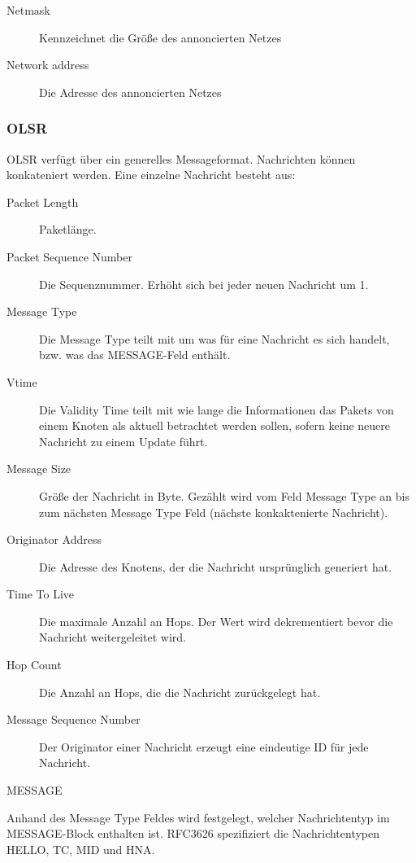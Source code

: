 \documentclass[a4paper,10pt]{article}
\begin{document}
\begin{description}
  \item[Netmask] Kennzeichnet die Größe des annoncierten Netzes
  \item[Network address] Die Adresse des annoncierten Netzes
\end{description}


\subsubsection*{OLSR}

OLSR verfügt über ein generelles Messageformat.
Nachrichten können konkateniert werden.
Eine einzelne Nachricht besteht aus:

\begin{description}
  \item[Packet Length] Paketlänge.
  \item[Packet Sequence Number] Die Sequenznummer. Erhöht sich bei jeder neuen Nachricht um 1. 
  \item[Message Type] Die Message Type teilt mit um was für eine Nachricht es sich handelt, bzw. was das MESSAGE-Feld enthält.
  \item[Vtime] Die Validity Time teilt mit wie lange die Informationen das Pakets von einem Knoten als aktuell betrachtet werden sollen, sofern keine neuere Nachricht zu einem Update führt.
  \item[Message Size] Größe der Nachricht in Byte. Gezählt wird vom Feld Message Type an bis zum nächsten Message Type Feld (nächste konkaktenierte Nachricht).
  \item[Originator Address] Die Adresse des Knotens, der die Nachricht ursprünglich generiert hat.
  \item[Time To Live] Die maximale Anzahl an Hops. Der Wert wird dekrementiert bevor die Nachricht weitergeleitet wird.
  \item[Hop Count] Die Anzahl an Hops, die die Nachricht zurückgelegt hat.
  \item[Message Sequence Number] Der Originator einer Nachricht erzeugt eine eindeutige ID für jede Nachricht.
  \item[MESSAGE]
\end{description}

Anhand des Message Type Feldes wird festgelegt, welcher Nachrichtentyp im MESSAGE-Block enthalten ist. 
RFC3626 spezifiziert die Nachrichtentypen HELLO, TC, MID und HNA.
\end{document}

